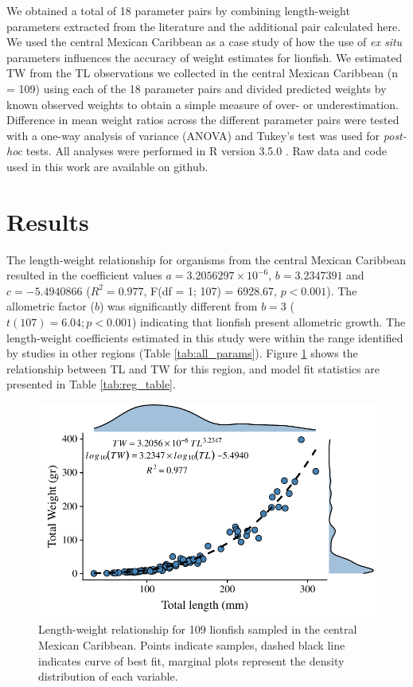 \documentclass[smallextended]{svjour3}       %
\begin{document}
We obtained a total of 18 parameter pairs by combining length-weight
parameters extracted from the literature and the additional pair
calculated here. We used the central Mexican Caribbean as a case study
of how the use of \emph{ex situ} parameters influences the accuracy of
weight estimates for lionfish. We estimated TW from the TL observations
we collected in the central Mexican Caribbean (n = 109) using each of
the 18 parameter pairs and divided predicted weights by known observed
weights to obtain a simple measure of over- or underestimation.
Difference in mean weight ratios across the different parameter pairs
were tested with a one-way analysis of variance (ANOVA) and Tukey's test
was used for \emph{post-hoc} tests. All analyses were performed in R
version 3.5.0 \citep{rcore_2018}. Raw data and code used in this work
are available on github.

\section{Results}\label{results}

The length-weight relationship for organisms from the central Mexican
Caribbean resulted in the coefficient values
\(a = 3.2056297\times 10^{-6}\), \(b = 3.2347391\) and
\(c = -5.4940866\) (\(R^2 = 0.977\), F(df = 1; 107) = 6928.67,
\(p < 0.001\)). The allometric factor (\(b\)) was significantly
different from \(b = 3\) (\(t(107) = 6.04; p<0.001\)) indicating that
lionfish present allometric growth. The length-weight coefficients
estimated in this study were within the range identified by studies in
other regions (Table \ref{tab:all_params}). Figure \ref{fig:l-w-carib}
shows the relationship between TL and TW for this region, and model fit
statistics are presented in Table \ref{tab:reg_table}.

\begin{figure}
\centering
\includegraphics{Manuscript_files/figure-latex/unnamed-chunk-7-1.pdf}
\caption{\label{fig:l-w-carib}Length-weight relationship for 109
lionfish sampled in the central Mexican Caribbean. Points indicate
samples, dashed black line indicates curve of best fit, marginal plots
represent the density distribution of each variable.}
\end{figure}
\end{document}
